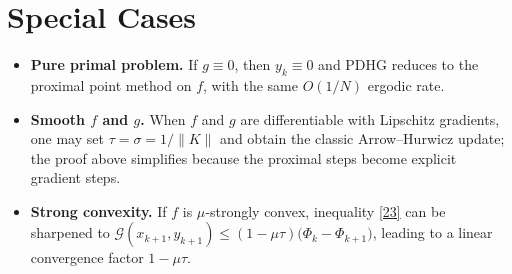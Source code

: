\documentclass[11pt]{article}
\begin{document}
\section*{Special Cases}
\begin{itemize}
\item \textbf{Pure primal problem.} If $g\equiv0$, then $y_{k}\equiv0$ and PDHG reduces to the proximal point method on $f$, with the same $O(1/N)$ ergodic rate.
\item \textbf{Smooth $f$ and $g$.} When $f$ and $g$ are differentiable with Lipschitz gradients, one may set $\tau=\sigma=1/\|K\|$ and obtain the classic Arrow–Hurwicz update; the proof above simplifies because the proximal steps become explicit gradient steps.
\item \textbf{Strong convexity.} If $f$ is $\mu$‑strongly convex, inequality \eqref{23} can be sharpened to  
$\mathcal{G}(x_{k+1},y_{k+1})\le (1-\mu\tau)\bigl(\Phi_{k}-\Phi_{k+1}\bigr)$, leading to a linear convergence factor $1-\mu\tau$.
\end{itemize}
\end{document}
